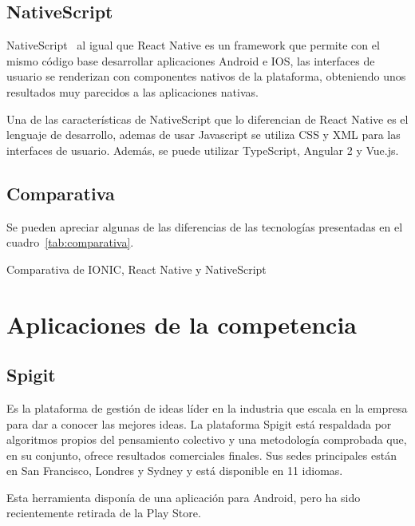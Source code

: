 \subsection{NativeScript}

NativeScript~\cite{NATSCR} al igual que React Native es un framework que permite con el mismo código base desarrollar aplicaciones 
Android e IOS, las interfaces de usuario se renderizan con componentes nativos de la plataforma, obteniendo unos 
resultados muy parecidos a las aplicaciones nativas.

Una de las características de NativeScript que lo diferencian de React Native es el lenguaje de desarrollo, ademas de 
usar Javascript se utiliza CSS y XML para las interfaces de usuario. Además, se puede utilizar TypeScript, Angular 2 y
Vue.js.

\subsection{Comparativa}

Se pueden apreciar algunas de las diferencias de las tecnologías presentadas en el cuadro~\ref{tab:comparativa}.

\begin{table}[comparativa]
	\centering
	{\small
		
	}
	\caption[Comparativa de IONIC, React Native, NativeScript]
	{Comparativa de IONIC, React Native y NativeScript~\cite{comparativaHibridas}}
	\label{tab:comparativa}
\end{table}

\section{Aplicaciones de la competencia}
\subsection{Spigit}

Es la plataforma de gestión de ideas líder en la industria que escala en la empresa para dar a conocer las mejores ideas. La plataforma Spigit está respaldada por algoritmos propios del pensamiento colectivo y una metodología comprobada que, en su conjunto, ofrece resultados comerciales finales. Sus sedes principales están en San Francisco, Londres y Sydney y está disponible en 11 idiomas.

Esta herramienta disponía de una aplicación para Android, pero ha sido recientemente retirada de la 
Play Store.

